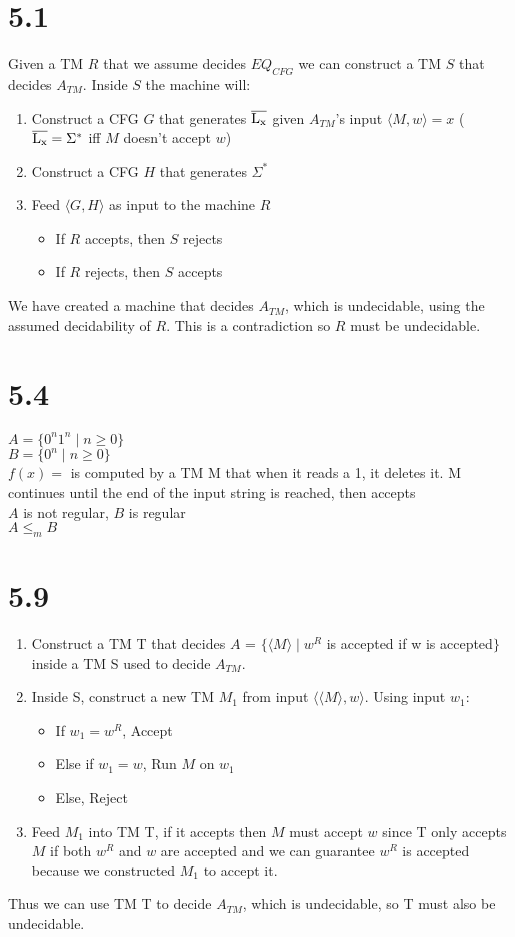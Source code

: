 \documentclass{article}
\begin{document}
\section*{5.1}
Given a TM $R$ that we assume decides $EQ_{CFG}$ we can construct a TM $S$ that decides $A_{TM}$. Inside $S$ the machine will:

\begin{enumerate}
    \item Construct a CFG $G$ that generates $\overline{\rm L_x}$ given $A_{TM}$'s input $\langle M, w\rangle = x$ ($\overline{\rm L_x} = \Sigma^*$ iff $M$ doesn't accept $w$)
    \item Construct a CFG $H$ that generates $\Sigma^*$
    \item Feed $\langle G, H \rangle$ as input to the machine $R$
    \begin{itemize}
        \item If $R$ accepts, then $S$ rejects
        \item If $R$ rejects, then $S$ accepts
    \end{itemize}
\end{enumerate}
We have created a machine that decides $A_{TM}$, which is undecidable, using the assumed decidability of $R$. This is a contradiction so $R$ must be undecidable.

\section*{5.4}
$A = \{0^n1^n \mid n \geq 0\}$\\
$B = \{0^n \mid n \geq 0\}$\\
$f(x)= $ is computed by a TM M that when it reads a 1, it deletes it. M continues until the end of the input string is reached, then accepts\\
$A$ is not regular, $B$ is regular\\
$A \leq_m B$
\section*{5.9}

\begin{enumerate}
    \item Construct a TM T that decides $A$ = $\{ \langle M \rangle \mid w^R$ is accepted if w is accepted$\}$ inside a TM S used to decide $A_{TM}$.
    \item Inside S, construct a new TM $M_1$ from input $\langle \langle M\rangle, w \rangle$. Using input $w_1$:
    \begin{itemize}
        \item If $w_1 = w^R$, Accept
        \item Else if $w_1 = w$, Run $M$ on $w_1$
        \item Else, Reject 
    \end{itemize}
    \item Feed ${M_1}$ into TM T, if it accepts then $M$ must accept $w$ since T only accepts ${M}$ if both $w^R$ and $w$ are accepted and we can guarantee $w^R$ is accepted because we constructed $M_1$ to accept it.
\end{enumerate}
Thus we can use TM T to decide $A_{TM}$, which is undecidable, so T must also be undecidable.
\end{document}
